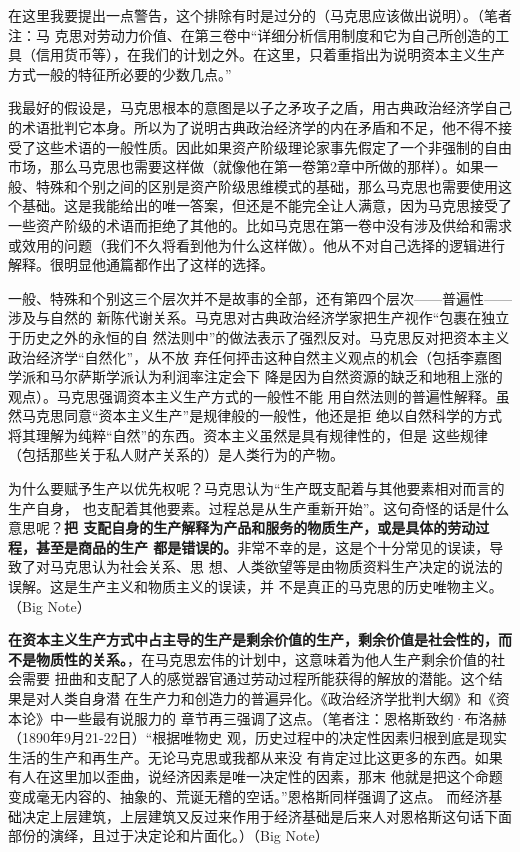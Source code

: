 在这里我要提出一点警告，这个排除有时是过分的（马克思应该做出说明）。（笔者注：马
克思对劳动力价值、在第三卷中“详细分析信用制度和它为自己所创造的工具（信用货币等），在我们的计划之外。在这里，只着重指出为说明资本主义生产方式一般的特征所必要的少数几点。” 


我最好的假设是，马克思根本的意图是以子之矛攻子之盾，用古典政治经济学自己的术语批判它本身。所以为了说明古典政治经济学的内在矛盾和不足，他不得不接受了这些术语的一般性质。因此如果资产阶级理论家事先假定了一个非强制的自由市场，那么马克思也需要这样做（就像他在第一卷第2章中所做的那样）。如果一般、特殊和个别之间的区别是资产阶级思维模式的基础，那么马克思也需要使用这个基础。这是我能给出的唯一答案，但还是不能完全让人满意，因为马克思接受了一些资产阶级的术语而拒绝了其他的。比如马克思在第一卷中没有涉及供给和需求或效用的问题（我们不久将看到他为什么这样做）。他从不对自己选择的逻辑进行解释。很明显他通篇都作出了这样的选择。

一般、特殊和个别这三个层次并不是故事的全部，还有第四个层次——普遍性——涉及与自然的
新陈代谢关系。马克思对古典政治经济学家把生产视作“包裹在独立于历史之外的永恒的自
然法则中”的做法表示了强烈反对。马克思反对把资本主义政治经济学“自然化”，从不放
弃任何抨击这种自然主义观点的机会（包括李嘉图学派和马尔萨斯学派认为利润率注定会下
降是因为自然资源的缺乏和地租上涨的观点）。马克思强调资本主义生产方式的一般性不能
用自然法则的普遍性解释。虽然马克思同意“资本主义生产”是规律般的一般性，他还是拒
绝以自然科学的方式将其理解为纯粹“自然”的东西。资本主义虽然是具有规律性的，但是
这些规律（包括那些关于私人财产关系的）是人类行为的产物。

为什么要赋予生产以优先权呢？马克思认为“生产既支配着与其他要素相对而言的生产自身，
也支配着其他要素。过程总是从生产重新开始”。这句奇怪的话是什么意思呢？\textbf{把
  支配自身的生产解释为产品和服务的物质生产，或是具体的劳动过程，甚至是商品的生产
  都是错误的。}非常不幸的是，这是个十分常见的误读，导致了对马克思认为社会关系、思
想、人类欲望等是由物质资料生产决定的说法的误解。这是生产主义和物质主义的误读，并
不是真正的马克思的历史唯物主义。（Big Note）


\textbf{在资本主义生产方式中占主导的生产是剩余价值的生产，剩余价值是社会性的，而
  不是物质性的关系。}，在马克思宏伟的计划中，这意味着为他人生产剩余价值的社会需要
扭曲和支配了人的感觉器官通过劳动过程所能获得的解放的潜能。这个结果是对人类自身潜
在生产力和创造力的普遍异化。《政治经济学批判大纲》和《资本论》中一些最有说服力的
章节再三强调了这点。（笔者注：恩格斯致约·布洛赫（1890年9月21-22日）“根据唯物史
观，历史过程中的决定性因素归根到底是现实生活的生产和再生产。无论马克思或我都从来没
有肯定过比这更多的东西。如果有人在这里加以歪曲，说经济因素是唯一决定性的因素，那末
他就是把这个命题变成毫无内容的、抽象的、荒诞无稽的空话。”恩格斯同样强调了这点。
而经济基础决定上层建筑，上层建筑又反过来作用于经济基础是后来人对恩格斯这句话下面
部份的演绎，且过于决定论和片面化。）（Big Note）


